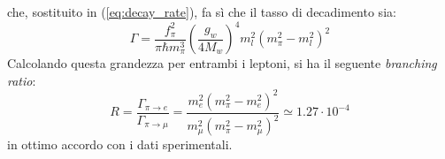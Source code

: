 \documentclass{subnucbo}
\begin{document}
che, sostituito in (\ref{eq:decay_rate}), fa sì che il tasso di decadimento sia:
\begin{equation}
        \Gamma = \frac { f _ { \pi } ^ { 2 } } { \pi \hbar m _ { \pi } ^ { 3 } } \left( \frac { g _ { w } } { 4 M _ { w } } \right) ^ { 4 } m _ { l } ^ { 2 } \left( m _ { \pi } ^ { 2 } - m _ { l } ^ { 2 } \right) ^ { 2 }
        \label{eq:decay_rate_pion}
\end{equation}
Calcolando questa grandezza per entrambi i leptoni, si ha il seguente \textit{branching ratio}:
\begin{equation}
        R = \frac { \Gamma _ { \pi \rightarrow e } } { \Gamma _ { \pi \rightarrow \mu } } = \frac { m _ { e } ^ { 2 } \left( m_{\pi}^{2} - m_{e}^2  \right) ^ { 2 } } { m _ { \mu } ^ { 2 } \left( m_{\pi}^2 - m_{\mu}^2 \right) ^ { 2 } } \simeq  1.27 \cdot 10 ^ { - 4 }
        \label{eq:br_ratio}
\end{equation}
in ottimo accordo con i dati sperimentali.
\end{document}

